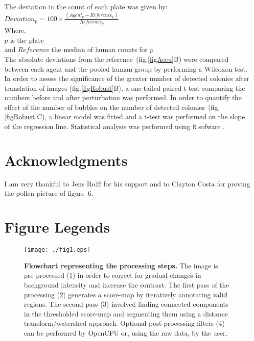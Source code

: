 \documentclass[10pt]{article}
\begin{document}
The deviation in the count of each plate was given by:\\
\newline{}
$Deviation_p =100\times{}\frac{ (Agent_p-Reference_p)}{Reference_p}$\\
\newline{}
Where,\\
$p$ is the plate\\
and $Reference$ the median of human counts for $p$\\

The absolute deviations from the reference~(fig.\ref{figAccu}B) were compared
between each agent and the pooled human group by performing a Wilcoxon test.
In order to assess the significance of the greater number of detected colonies
after translation of images (fig.\ref{figRobust}B), a  one-tailed paired t-test
comparing the numbers before and after perturbation was performed.
In order to quantify the effect of the number of bubbles on the number of
detected colonies~(fig.\ref{figRobust}C), a linear model was fitted and a t-test
was performed on the slope of the regression line.
Statistical analysis was performed using \texttt{R} sofware\cite{R} .
 
\section*{Acknowledgments}
I am very thankful to Jens Rolff for his support and to Clayton
Costa for proving the pollen picture of 
figure~6.


\newpage{}

\section*{Figure Legends} 

\begin{figure}[!ht]
\begin{center}
\texttt{[image: ./fig1.eps]}
\end{center}
\caption{{\bf Flowchart representing the processing steps.}
The image is pre-processed (1) in order to correct for gradual
changes in background intensity and increase the contrast.
The first pass of the processing (2) generates a score-map by iteratively annotating valid regions.
The second pass (3) involved finding connected components in the thresholded score-map and segmenting them using a distance transform/watershed approach.
Optional post-processing filters (4) can be performed by OpenCFU or, using the raw data, by the user. 
}
\label{figFlowChart}
\end{figure}
\end{document}
